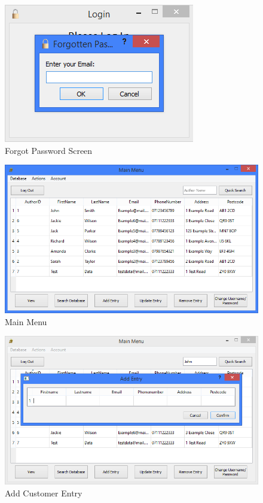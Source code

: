 \begin{figure}[H]
    \caption{Forgot Password Screen} \label{fig:ForgotPasswordScreen}
    \includegraphics[width=\textwidth]{./Maintenance/UserInterface/ForgotPasswordScreen.png}
\end{figure}

\begin{figure}[H]
    \caption{Main Menu} \label{fig:MainMenu}
    \includegraphics[width=\textwidth]{./Maintenance/UserInterface/MainMenu.png}
\end{figure}

\begin{figure}[H]
    \caption{Add Customer Entry} \label{fig:AddEntry}
    \includegraphics[width=\textwidth]{./Maintenance/UserInterface/AddEntry.png}
\end{figure}

